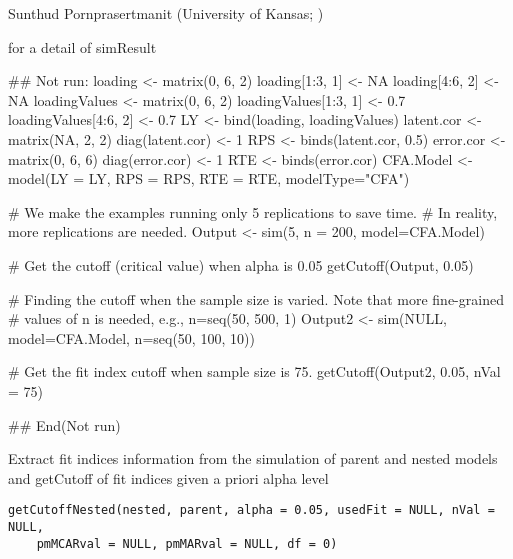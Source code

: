 \documentclass[a4paper]{book}
\begin{document}
%
\begin{Author}\relax
Sunthud Pornprasertmanit (University of Kansas; )
\end{Author}
%
\begin{SeeAlso}\relax
{} for a detail of simResult
\end{SeeAlso}
%
\begin{Examples}
\begin{ExampleCode}
## Not run: 
loading <- matrix(0, 6, 2)
loading[1:3, 1] <- NA
loading[4:6, 2] <- NA
loadingValues <- matrix(0, 6, 2)
loadingValues[1:3, 1] <- 0.7
loadingValues[4:6, 2] <- 0.7
LY <- bind(loading, loadingValues)
latent.cor <- matrix(NA, 2, 2)
diag(latent.cor) <- 1
RPS <- binds(latent.cor, 0.5)
error.cor <- matrix(0, 6, 6)
diag(error.cor) <- 1
RTE <- binds(error.cor)
CFA.Model <- model(LY = LY, RPS = RPS, RTE = RTE, modelType="CFA")

# We make the examples running only 5 replications to save time.
# In reality, more replications are needed.
Output <- sim(5, n = 200, model=CFA.Model)

# Get the cutoff (critical value) when alpha is 0.05
getCutoff(Output, 0.05)

# Finding the cutoff when the sample size is varied. Note that more fine-grained 
# values of n is needed, e.g., n=seq(50, 500, 1)
Output2 <- sim(NULL, model=CFA.Model, n=seq(50, 100, 10))

# Get the fit index cutoff when sample size is 75.
getCutoff(Output2, 0.05, nVal = 75)

## End(Not run)
\end{ExampleCode}
\end{Examples}
%
\begin{Description}\relax
Extract fit indices information from the simulation of parent and nested models and getCutoff of fit indices given a priori alpha level
\end{Description}
%
\begin{Usage}
\begin{verbatim}
getCutoffNested(nested, parent, alpha = 0.05, usedFit = NULL, nVal = NULL, 
	pmMCARval = NULL, pmMARval = NULL, df = 0)
\end{verbatim}
\end{Usage}
%
\end{document}
